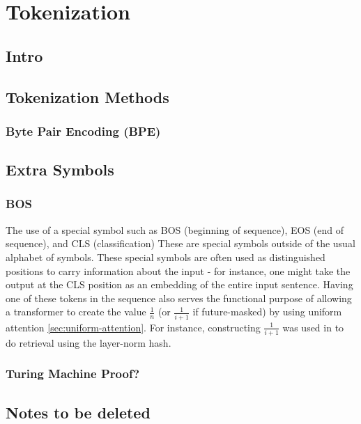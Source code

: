%
\chapter{Tokenization}
%

\section{Intro}


\section{Tokenization Methods}

\subsection{Byte Pair Encoding (BPE)}


\section{Extra Symbols}

\subsection{BOS}\label{sec:BOS}

The use of a special symbol such as BOS (beginning of sequence), EOS (end of sequence), and CLS (classification) These are special symbols outside of the usual alphabet of symbols. These special symbols are often used as distinguished positions to carry information about the input - for instance, one might take the output at the CLS position as an embedding of the entire input sentence. Having one of these tokens in the sequence also serves the functional purpose of allowing a transformer to create the value $\frac{1}{n}$ (or $\frac{1}{i+1}$ if future-masked) by using uniform attention \cref{sec:uniform-attention}. For instance, constructing $\frac{1}{i+1}$ was used in \citet{merrill-sabharwal-2024-cot} to do retrieval using the layer-norm hash.

\subsection{Turing Machine Proof?}



\section{Notes to be deleted}



